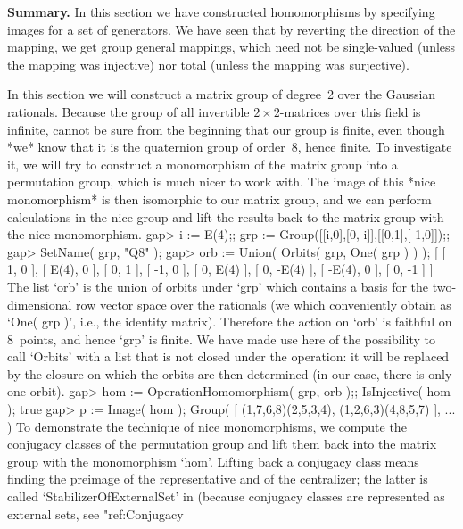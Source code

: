 {\bf  Summary.}   In this section   we  have constructed homomorphisms by
specifying images for a set of generators. We have seen that by reverting
the direction of  the mapping, we get  group general mappings, which need
not be single-valued (unless the mapping was injective) nor total (unless
the mapping was surjective).


In this section we  will construct a  matrix group  of degree~2  over the
Gaussian  rationals.    Because  the group of   all   invertible $2\times
2$-matrices over this field  is infinite, {\GAP} cannot  be sure from the
beginning that our group is finite, even though *we* know  that it is the
quaternion group of order~8, hence finite. To investigate it, we will try
to construct a monomorphism of the matrix group into a permutation group,
which is much nicer to  work with. The image  of this *nice monomorphism*
is then isomorphic to  our matrix group,  and we can perform calculations
in the nice group and lift the results back to  the matrix group with the
nice monomorphism.
\beginexample
    gap> i := E(4);; grp := Group([[i,0],[0,-i]],[[0,1],[-1,0]]);;
    gap> SetName( grp, "Q8" );
    gap> orb := Union( Orbits( grp, One( grp ) ) );
    [ [ 1, 0 ], [ E(4), 0 ], [ 0, 1 ], [ -1, 0 ], [ 0, E(4) ],
        [ 0, -E(4) ], [ -E(4), 0 ], [ 0, -1 ] ]
\endexample
The list `orb' is the union of orbits under `grp'  which contains a basis
for the two-dimensional row  vector  space over  the rationals (we  which
conveniently   obtain   as `One(  grp   )',  i.e.,  the identity matrix).
Therefore the action on `orb' is faithful on 8~points, and hence `grp' is
finite. We have made use here of the  possibility to call `Orbits' with a
list that is not closed  under the operation: it will  be replaced by the
closure on  which the orbits  are then determined  (in our case, there is
only one orbit).
\beginexample
    gap> hom := OperationHomomorphism( grp, orb );; IsInjective( hom );
    true
    gap> p := Image( hom );
    Group( [ (1,7,6,8)(2,5,3,4), (1,2,6,3)(4,8,5,7) ], ... )
\endexample
To  demonstrate the technique  of   nice  monomorphisms, we  compute  the
conjugacy classes of the  permutation group and  lift them back into  the
matrix group with the monomorphism `hom'. Lifting  back a conjugacy class
means finding the preimage of  the representative and of the centralizer;
the latter  is   called  `StabilizerOfExternalSet'   in {\GAP}   (because
conjugacy  classes are represented as   external sets, see "ref:Conjugacy
